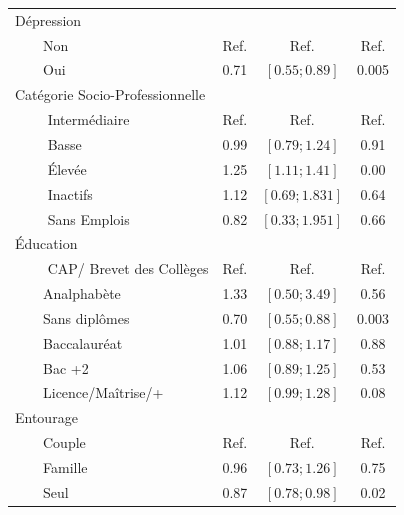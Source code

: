 \documentclass{book}
\begin{document}
\begin{longtable}{lccc}
Dépression&&&\\
$\qquad$Non & Ref. & Ref. & Ref.\\
$\qquad$Oui & 0.71 & $\left[0.55 ; 0.89\right]$ & 0.005\\
Catégorie Socio-Professionnelle&&&\\
$\qquad$ Intermédiaire & Ref. & Ref. & Ref.\\
$\qquad$ Basse & 0.99 & $\left[0.79 ; 1.24 \right]$ &0.91\\
$\qquad$ Élevée & 1.25 & $\left[1.11 ; 1.41 \right]$ &0.00\\
$\qquad$ Inactifs &1.12 &   $\left[0.69 ; 1.831 \right]$ & 0.64\\
$\qquad$ Sans Emplois &0.82 &  $\left[0.33 ; 1.951 \right]$&0.66 \\ 
Éducation&&&\\
$\qquad$ CAP/ Brevet des Collèges &Ref.&Ref.&Ref.\\
$\qquad$Analphabète&1.33&$\left[0.50 ; 3.49 \right]$&0.56\\
$\qquad$Sans diplômes&0.70& $\left[0.55 ; 0.88 \right]$&0.003\\
$\qquad$Baccalauréat&1.01&$\left[0.88 ; 1.17 \right]$&0.88\\
$\qquad$Bac +2&1.06&$\left[0.89 ; 1.25 \right]$&0.53\\
$\qquad$Licence/Maîtrise/+ & 1.12 & $\left[0.99 ; 1.28 \right]$ &0.08\\
Entourage &&&\\
$\qquad$Couple&Ref.&Ref.&Ref.\\
$\qquad$Famille &0.96&$\left[0.73 ; 1.26 \right]$&0.75\\
$\qquad$Seul&0.87& $\left[0.78 ; 0.98 \right]$& 0.02\\
    \hline
    \end{longtable} 
\end{document}
